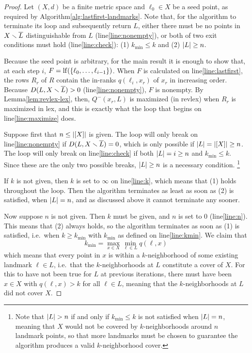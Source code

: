 \documentclass[
]{article}
\begin{document}
\begin{proof}
Let $(X,d)$ be a finite metric space and $\ell_0 \in X$ be a seed point, as required by Algorithm\nbs\ref{alg:lastfirst-landmarks}.
Note that, for the algorithm to terminate its loop and subsequently return $L$, either there must be no points in $X \smallsetminus \overline{L}$ distinguishable from $L$ (line\nbs\ref{line:nonempty}), or both of two exit conditions must hold (line\nbs\ref{line:check}):
  (1) $k_{\min} \leq k$ and
  (2) $\lvert L\rvert \geq n$.

Because the seed point is arbitrary, for the main result it is enough to show that, at each step $i$, $F = \operatorname{lf}(\{ \ell_0, \ldots, \ell_{i-1} \})$.
When $F$ is calculated on line\nbs\ref{line:lastfirst}, the rows $R_r$ of $R$ contain the in-ranks $q(\ell_i, x_r)$ of $x_r$ in increasing order.
Because $D(L, X \smallsetminus \overline{L}) > 0$ (line\nbs\ref{line:nonempty}), $F$ is nonempty.
By Lemma\nbs\ref{lem:revlex-lex}, then, $Q^-(x_r, L)$ is maximized (in revlex) when $R_r$ is maximized in lex, and this is exactly what the loop that begins on line\nbs\ref{line:maximize} does.

Suppose first that $n \leq \lvert [X]\rvert$ is given.
The loop will only break on line\nbs\ref{line:nonempty} if $D(L, X \smallsetminus \overline{L}) = 0$, which is only possible if $\lvert L\rvert = \lvert [X]\rvert \geq n$.
The loop will only break on line\nbs\ref{line:check} if both $\lvert L\rvert = i \geq n$ and $k_{\min} \leq k$.
Since these are the only two possible breaks, $\lvert L\rvert \geq n$ is a necessary condition.
\footnote{Note that $\lvert L\rvert > n$ if and only if $k_{\min} \leq k$ is not satisfied when $\lvert L\rvert = n$, meaning that $X$ would not be covered by $k$-neighborhoods around $n$ landmark points, so that more landmarks must be chosen to guarantee the algorithm produces a valid $k$-neighborhood cover.}

If $k$ is not given, then $k$ is set to $\infty$ on line\nbs\ref{line:k}, which means that (1) holds throughout the loop.
Then the algorithm terminates as least as soon as (2) is satisfied, when $\lvert L\rvert = n$, and as discussed above it cannot terminate any sooner.

Now suppose $n$ is not given.
Then $k$ must be given, and $n$ is set to $0$ (line\nbs\ref{line:n}).
This means that (2) always holds, so the algorithm terminates as soon as (1) is satisfied, i.e.\ when $k \geq k_{\min}$ with $k_{\min}$ as defined on line\nbs\ref{line:kmin}.
We claim that
\[ k_{\min} = \max_{x \in X}{ \min_{\ell \in L}{ q(\ell, x) } } \]
which means that every point in $x$ is within a $k$-neighborhood of some existing landmark $\ell \in L$, i.e.\ that the $k$-neighborhoods at $L$ constitute a cover of $X$.
For this to have not been true for $L$ at previous iterations, there must have been $x \in X$ with $q(\ell, x) > k$ for all $\ell \in L$, meaning that the $k$-neighborhoods at $L$ did not cover $X$.


\end{proof}
\end{document}
